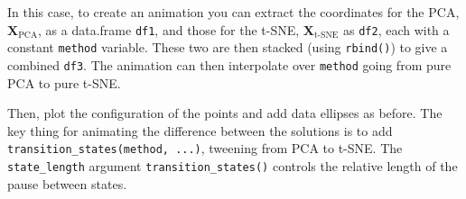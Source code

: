 \documentclass[
  letterpaper,
  10pt,
  krantz2]{krantz}
\makeatletter
\newenvironment{Shaded}{\begin{snugshade}}{\end{snugshade}}
\newcommand{\AttributeTok}[1]{\textcolor[rgb]{0.40,0.45,0.13}{#1}}
\newcommand{\CommentTok}[1]{\textcolor[rgb]{0.37,0.37,0.37}{#1}}
\newcommand{\ConstantTok}[1]{\textcolor[rgb]{0.56,0.35,0.01}{#1}}
\newcommand{\DecValTok}[1]{\textcolor[rgb]{0.68,0.00,0.00}{#1}}
\newcommand{\FunctionTok}[1]{\textcolor[rgb]{0.28,0.35,0.67}{#1}}
\newcommand{\NormalTok}[1]{\textcolor[rgb]{0.00,0.23,0.31}{#1}}
\newcommand{\OtherTok}[1]{\textcolor[rgb]{0.00,0.23,0.31}{#1}}
\newcommand{\SpecialCharTok}[1]{\textcolor[rgb]{0.37,0.37,0.37}{#1}}
\newcommand{\StringTok}[1]{\textcolor[rgb]{0.13,0.47,0.30}{#1}}
\newenvironment{kframe}{%
  \medskip{}
  \setlength{\fboxsep}{.8em}
  \def\at@end@of@kframe{}%
  \ifinner\ifhmode%
  \def\at@end@of@kframe{\end{minipage}}%
  \begin{minipage}{\columnwidth}%
  \fi\fi%
  \def\FrameCommand##1{\hskip\@totalleftmargin \hskip-\fboxsep
  \colorbox{shadecolor}{##1}\hskip-\fboxsep
      \hskip-\linewidth \hskip-\@totalleftmargin \hskip\columnwidth}%
  \MakeFramed {\advance\hsize-\width
    \@totalleftmargin\z@ \linewidth\hsize
    \@setminipage}}%
{\par\unskip\endMakeFramed%
  \at@end@of@kframe}
\renewenvironment{Shaded}{\begin{kframe}}{\end{kframe}}
\makeatother
\begin{document}
In this case, to create an animation you can extract the coordinates for
the PCA, \(\mathbf{X}_{\text{PCA}}\), as a data.frame \texttt{df1}, and
those for the t-SNE, \(\mathbf{X}_{\text{t-SNE}}\) as \texttt{df2}, each
with a constant \texttt{method} variable. These two are then stacked
(using \texttt{rbind()}) to give a combined \texttt{df3}. The animation
can then interpolate over \texttt{method} going from pure PCA to pure
t-SNE.

\begin{Shaded}
\end{Shaded}

Then, plot the configuration of the points and add data ellipses as
before. The key thing for animating the difference between the solutions
is to add \texttt{transition\_states(method,\ ...)}, tweening from PCA
to t-SNE. The \texttt{state\_length} argument
\texttt{transition\_states()} controls the relative length of the pause
between states.
\end{document}
